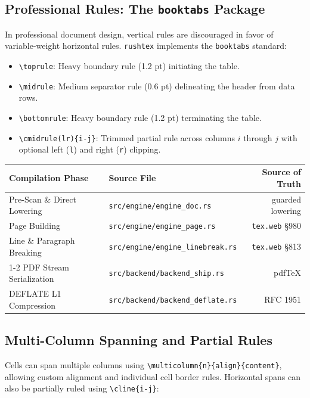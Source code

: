 \documentclass[11pt, a4paper]{article}
\begin{document}
\medskip

\subsection{Professional Rules: The \texttt{booktabs} Package}
In professional document design, vertical rules are discouraged in favor of variable-weight horizontal rules. \texttt{rushtex} implements the \texttt{booktabs} standard:
\begin{itemize}
\item \verb|\toprule|: Heavy boundary rule (1.2 pt) initiating the table.
\item \verb|\midrule|: Medium separator rule (0.6 pt) delineating the header from data rows.
\item \verb|\bottomrule|: Heavy boundary rule (1.2 pt) terminating the table.
\item \verb|\cmidrule(lr){i-j}|: Trimmed partial rule across columns $i$ through $j$ with optional left (\texttt{l}) and right (\texttt{r}) clipping.
\end{itemize}

\medskip

\begin{tabular}{llr}
\toprule
\textbf{Compilation Phase} & \textbf{Source File} & \textbf{Source of Truth} \\
\midrule
Pre-Scan \& Direct Lowering & \texttt{src/engine/engine\_doc.rs} & guarded lowering \\
Page Building & \texttt{src/engine/engine\_page.rs} & \texttt{tex.web} \S980 \\
Line \& Paragraph Breaking & \texttt{src/engine/engine\_linebreak.rs} & \texttt{tex.web} \S813 \\
\cmidrule(lr){1-2}
PDF Stream Serialization & \texttt{src/backend/backend\_ship.rs} & pdfTeX \\
DEFLATE L1 Compression & \texttt{src/backend/backend\_deflate.rs} & RFC 1951 \\
\bottomrule
\end{tabular}

\medskip

\subsection{Multi-Column Spanning and Partial Rules}
Cells can span multiple columns using \verb|\multicolumn{n}{align}{content}|, allowing custom alignment and individual cell border rules. Horizontal spans can also be partially ruled using \verb|\cline{i-j}|:
\end{document}

